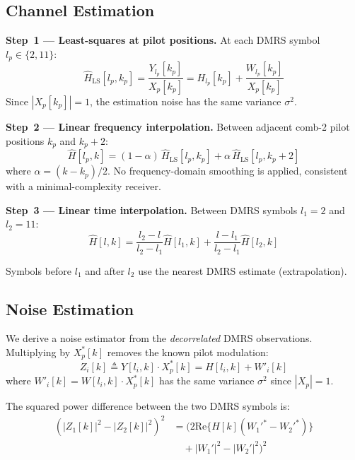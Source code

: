 \documentclass[11pt,a4paper,twoside]{article}
\newcommand{\Hest}{\hat{H}}
\begin{document}
\subsection{Channel Estimation}
\label{sec:ofdm_chest}

\textbf{Step~1 --- Least-squares at pilot positions.} At each DMRS symbol $l_p \in \{2, 11\}$:
\begin{equation}
    \Hest_{\text{LS}}[l_p, k_p] = \frac{Y_{l_p}[k_p]}{X_p[k_p]} = H_{l_p}[k_p] + \frac{W_{l_p}[k_p]}{X_p[k_p]}
\end{equation}
Since $|X_p[k_p]| = 1$, the estimation noise has the same variance $\sigma^2$.

\textbf{Step~2 --- Linear frequency interpolation.} Between adjacent comb-2 pilot positions $k_p$ and $k_p + 2$:
\begin{equation}
    \Hest[l_p, k] = (1 - \alpha) \, \Hest_{\text{LS}}[l_p, k_p] + \alpha \, \Hest_{\text{LS}}[l_p, k_p + 2]
\end{equation}
where $\alpha = (k - k_p) / 2$. No frequency-domain smoothing is applied, consistent with a minimal-complexity receiver.

\textbf{Step~3 --- Linear time interpolation.} Between DMRS symbols $l_1 = 2$ and $l_2 = 11$:
\begin{equation}
    \Hest[l, k] = \frac{l_2 - l}{l_2 - l_1} \Hest[l_1, k] + \frac{l - l_1}{l_2 - l_1} \Hest[l_2, k]
    \label{eq:time_interp}
\end{equation}

Symbols before $l_1$ and after $l_2$ use the nearest DMRS estimate (extrapolation).

\subsection{Noise Estimation}
\label{sec:ofdm_noise}

We derive a noise estimator from the \emph{decorrelated} DMRS observations. Multiplying by $X_p^*[k]$ removes the known pilot modulation:
\begin{equation}
    Z_i[k] \triangleq Y[l_i, k] \cdot X_p^*[k] = H[l_i, k] + W'_i[k]
    \label{eq:decorr}
\end{equation}
where $W'_i[k] = W[l_i, k] \cdot X_p^*[k]$ has the same variance $\sigma^2$ since $|X_p| = 1$.

The squared power difference between the two DMRS symbols is:
\begin{align}
    \left(|Z_1[k]|^2 - |Z_2[k]|^2\right)^2 &= \Big(2\text{Re}\{H[k](W_1'^* - W_2'^*)\} \nonumber \\
    &\quad + |W_1'|^2 - |W_2'|^2\Big)^2
\end{align}
\end{document}
